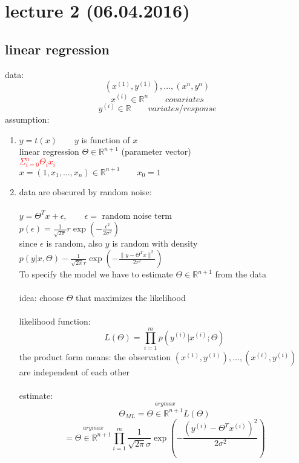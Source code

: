 \section*{lecture 2 (06.04.2016)}
\subsection*{linear regression}
data: \space \[(x^{(1)}, y^{(1)}), \dots , (x^{n}, y^{n})\]
\[x^{(i)} \in \mathbb{R}^n \quad\quad covariates\]
\[y^{(i)} \in \mathbb{R} \quad\quad variates/response \]
assumption:
\begin{enumerate}[(1)]
\item $y = t(x) \quad\quad y$ is function of $x$\\
linear regression \space\space {} \space $\Theta \in \mathbb{R}^{n+1}$ (parameter vector)\\
\textcolor{red}{\quad\quad\quad\quad\quad\quad\quad\quad\quad$\Sigma^n_{i = 0} \Theta_i x_i$}\\
$x= (1,x_1, \dots ,x_n) \in \mathbb{R}^{n+1} \quad \quad x_0 = 1$
\item data are obscured by random noise:\\\\
$y = \Theta^T x +\epsilon, \quad\quad \epsilon = $ random noise term\\
$p(\epsilon) = \frac{1}{\sqrt{2\pi}} r \exp (- \frac{\epsilon^2}{2 \sigma^2})$\\
since $\epsilon$ is random, also $y$ is random with density $p(y|x, \Theta) - \frac{1}{\sqrt{2\pi}r} \exp (- \frac{\lVert y- \Theta^T x\lVert^2}{2r^2})$\\
To specify the model we have to estimate $\Theta \in \mathbb{R}^{n+1}$ from the data\\\\
idea: choose $\Theta$ that maximizes the likelihood\\\\
likelihood function:
\[L(\Theta) = \prod^m_{i=1} p(y^{(i)}|x^{(i)};\Theta)\]
the product form means: the observation $(x^{(1)},y^{(1)}), \dots , (x^{(i)}, y^{(i)})$ are independent of each other\\\\
estimate:
\[ \Theta_{ML} = \stackrel{argmax}{\Theta \in \mathbb{R}^{n+1}} L(\Theta) \]
\[ = \stackrel{argmax}{\Theta \in \mathbb{R}^{n+1}} \prod^m_{i=1} \frac{1}{\sqrt{2 \pi} \sigma} \exp \left(- \frac{(y^{(i)} - \Theta^T x^{(i)})^2}{2 \sigma^2}\right)\]

\end{enumerate}
